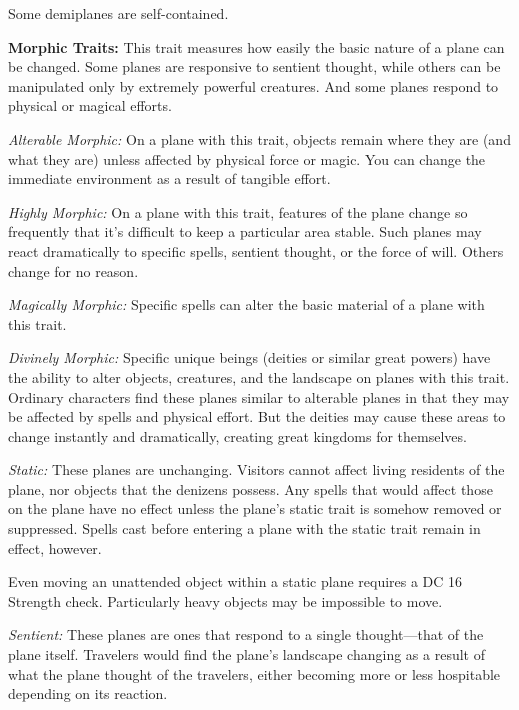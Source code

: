Some demiplanes are self-contained.

\textbf{Morphic Traits:} This trait measures how easily the basic nature of a plane can be changed. Some planes are responsive to sentient thought, while others can be manipulated only by extremely powerful creatures. And some planes respond to physical or magical efforts.

\textit{Alterable Morphic:} On a plane with this trait, objects remain where they are (and what they are) unless affected by physical force or magic. You can change the immediate environment as a result of tangible effort.

\textit{Highly Morphic:} On a plane with this trait, features of the plane change so frequently that it's difficult to keep a particular area stable. Such planes may react dramatically to specific spells, sentient thought, or the force of will. Others change for no reason.

\textit{Magically Morphic:} Specific spells can alter the basic material of a plane with this trait.

\textit{Divinely Morphic:} Specific unique beings (deities or similar great powers) have the ability to alter objects, creatures, and the landscape on planes with this trait. Ordinary characters find these planes similar to alterable planes in that they may be affected by spells and physical effort. But the deities may cause these areas to change instantly and dramatically, creating great kingdoms for themselves.

\textit{Static:} These planes are unchanging. Visitors cannot affect living residents of the plane, nor objects that the denizens possess. Any spells that would affect those on the plane have no effect unless the plane's static trait is somehow removed or suppressed. Spells cast before entering a plane with the static trait remain in effect, however.

Even moving an unattended object within a static plane requires a DC 16 Strength check. Particularly heavy objects may be impossible to move.

\textit{Sentient:} These planes are ones that respond to a single thought---that of the plane itself. Travelers would find the plane's landscape changing as a result of what the plane thought of the travelers, either becoming more or less hospitable depending on its reaction.